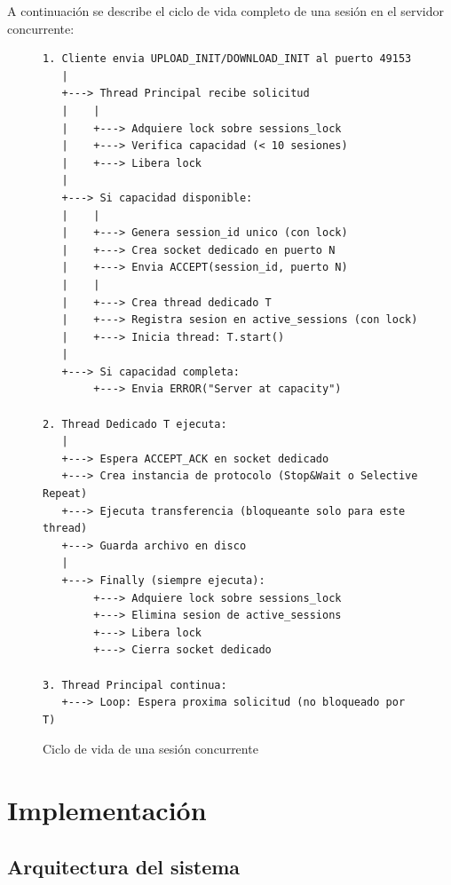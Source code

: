 A continuación se describe el ciclo de vida completo de una sesión en el servidor concurrente:

\begin{figure}[H]
\centering
\small
\begin{minipage}{0.9\textwidth}
\begin{verbatim}
1. Cliente envia UPLOAD_INIT/DOWNLOAD_INIT al puerto 49153
   |
   +---> Thread Principal recibe solicitud
   |    |
   |    +---> Adquiere lock sobre sessions_lock
   |    +---> Verifica capacidad (< 10 sesiones)
   |    +---> Libera lock
   |
   +---> Si capacidad disponible:
   |    |
   |    +---> Genera session_id unico (con lock)
   |    +---> Crea socket dedicado en puerto N
   |    +---> Envia ACCEPT(session_id, puerto N)
   |    |
   |    +---> Crea thread dedicado T
   |    +---> Registra sesion en active_sessions (con lock)
   |    +---> Inicia thread: T.start()
   |
   +---> Si capacidad completa:
        +---> Envia ERROR("Server at capacity")

2. Thread Dedicado T ejecuta:
   |
   +---> Espera ACCEPT_ACK en socket dedicado
   +---> Crea instancia de protocolo (Stop&Wait o Selective Repeat)
   +---> Ejecuta transferencia (bloqueante solo para este thread)
   +---> Guarda archivo en disco
   |
   +---> Finally (siempre ejecuta):
        +---> Adquiere lock sobre sessions_lock
        +---> Elimina sesion de active_sessions
        +---> Libera lock
        +---> Cierra socket dedicado

3. Thread Principal continua:
   +---> Loop: Espera proxima solicitud (no bloqueado por T)
\end{verbatim}
\end{minipage}
\caption{Ciclo de vida de una sesión concurrente}
\end{figure}

















\section{Implementación}
\subsection{Arquitectura del sistema}
